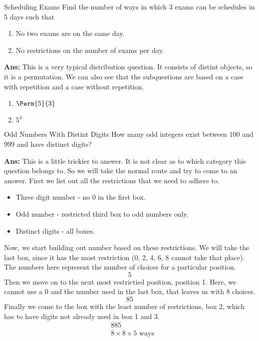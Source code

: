 \begin{exampletcb}
    {Scheduling Exams}{}
    Find the number of ways in which 3 exams can be schedules in 5 days such that \\
    \begin{enumerate}
        \item No two exams are on the same day.
        \item No restrictions on the number of exams per day.
    \end{enumerate}

    \textbf{Ans:} This is a very typical distribution question. It consists of distint objects, so it is a permutation. We can also see that the subquestions are based on a case with repetition and a case without repetition.
    \begin{enumerate}
        \item \mbox{$\Perm{5}{3}$}
        \item \mbox{$5^3$}
    \end{enumerate}
\end{exampletcb}



\begin{exampletcb}
    {Odd Numbers With Distint Digits}{}
    How many odd integers exist between 100 and 999 and have distinct digits?

    \textbf{Ans:} This is a little trickier to answer. It is not clear as to which category this question belongs to. So we will take the normal route and try to come to an answer. First we list out all the restrictions that we need to adhere to.
    \begin{itemize}
        \item Three digit number - no 0 in the first box.
        \item Odd number - restricted third box to odd numbers only.
        \item Distinct digits - all boxes.
    \end{itemize}
    Now, we start building out number based on these restrictions. We will take the last box, since it has the most restriction (0, 2, 4, 6, 8 cannot take that place). The numbers here represent the number of choices for a particular position.
    \[
        \boxed{}\boxed{}\boxed{5}
    \]
    Then we move on to the next most restrictied position, position 1. Here, we cannot use a 0 and the number used in the last box, that leaves us with 8 choices.
    \[
        \boxed{8}\boxed{}\boxed{5}
    \]
    Finally we come to the box with the least number of restrictions, box 2, which has to have digits not already used in box 1 and 3. 
    \begin{align*}
         & \boxed{8}\boxed{8}\boxed{5}      \\
         & 8 \times 8 \times 5 \text{ ways}
    \end{align*}
\end{exampletcb}


